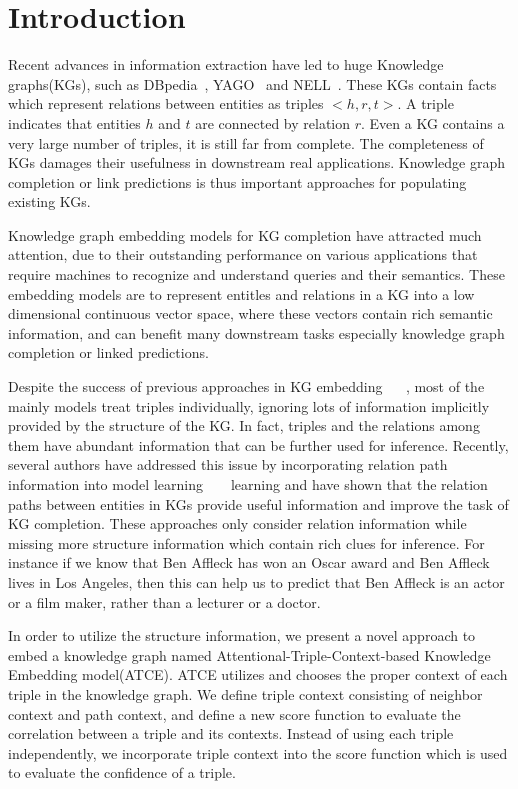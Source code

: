 \section{Introduction}
Recent advances in information extraction have led to huge Knowledge graphs(KGs), such as DBpedia~\cite{DBpedia2007}, YAGO~\cite{Yago2007} and NELL~\cite{NELL2015}. These KGs contain facts which represent relations between entities as triples $<h,r,t>$. A triple indicates that entities $h$ and $t$ are connected by relation $r$. Even a KG contains a very large number of triples, it is still far from complete. The completeness of KGs damages their usefulness in downstream real applications. Knowledge graph completion or link predictions is thus important approaches for populating existing KGs.

Knowledge graph embedding models for KG completion have attracted much attention, due to their outstanding performance on various applications that require machines to recognize and understand queries and their semantics. These embedding models are to represent entitles and relations in a KG into a low dimensional continuous vector space, where these vectors contain rich semantic information, and can benefit many downstream tasks especially knowledge graph completion or linked predictions.

Despite the success of previous approaches in KG embedding ~\cite{BordesUGWY13} ~\cite{WangZFC14}, most of the mainly models treat triples individually, ignoring lots of information implicitly provided by the structure of the KG. In fact, triples and the relations among them have abundant information that can be further used for inference. Recently, several authors have addressed this issue by incorporating relation path information into model learning ~\cite{LinLLSRL15} ~\cite{Toutanova16} learning and have shown that the relation paths between entities in KGs provide useful information and improve the task of KG completion. These approaches only consider relation information while missing more structure information which contain rich clues for inference. For instance if we know that Ben Affleck has won an Oscar award and Ben Affleck lives in Los Angeles, then this can help us to predict that Ben Affleck is an actor or a film maker, rather than a lecturer or a doctor.

In order to utilize the structure information, we present a novel approach to embed a knowledge graph named Attentional-Triple-Context-based Knowledge Embedding model(ATCE). ATCE utilizes and chooses the proper context of each triple in the knowledge graph. We define triple context consisting of neighbor context and path context, and define a new score function to evaluate the correlation between a triple and its contexts. Instead of using each triple independently, we incorporate triple context into the score function which is used to evaluate the confidence of a triple. 

